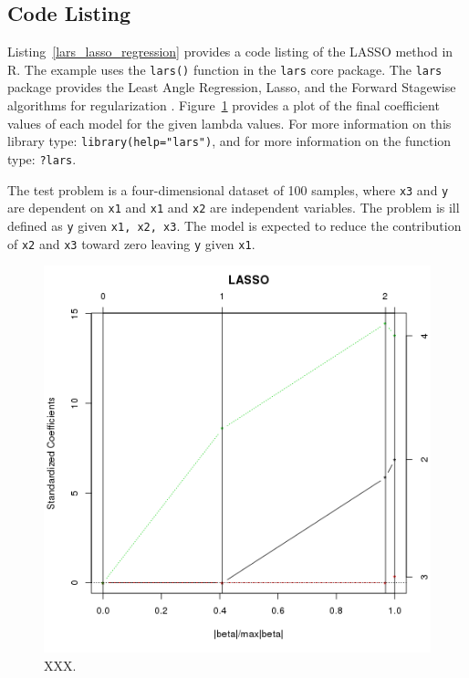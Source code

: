 \subsection{Code Listing}
Listing~\ref{lars_lasso_regression} provides a code listing of the LASSO method in R.
The example uses the \texttt{lars()} function in the \texttt{lars} core package. The \texttt{lars} package provides the Least Angle Regression, Lasso, and the Forward Stagewise algorithms for regularization \cite{Hastie2011}. Figure~\ref{plot:lasso_result} provides a plot of the final coefficient values of each model for the given lambda values. For more information on this library type: \texttt{library(help="lars")}, and for more information on the function type: \texttt{?lars}.

The test problem is a four-dimensional dataset of 100 samples, where \texttt{x3} and \texttt{y} are dependent on \texttt{x1} and \texttt{x1} and \texttt{x2} are independent variables. The problem is ill defined as \texttt{y} given \texttt{x1, x2, x3}. The model is expected to reduce the contribution of \texttt{x2} and \texttt{x3} toward zero leaving \texttt{y} given \texttt{x1}.




\begin{figure}[htp]
\centering
\includegraphics[scale=0.60]{a_regularization/lasso_result.png}
\caption{XXX.}
\label{plot:lasso_result}
\end{figure}

